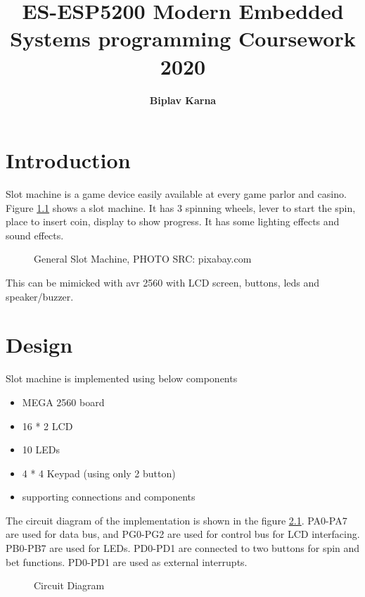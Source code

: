 \documentclass[a4paper,13pt,openany,sffamily]{memoir}
\title{\Huge\bfseries ES-ESP5200 Modern Embedded Systems programming Coursework 2020}
\author{\LARGE \bfseries Biplav Karna}
\begin{document}
\maketitle

\chapter {Introduction}
Slot machine is a game device easily available at every game parlor and casino. Figure \ref{Fig_Casino_Slot_Machine} shows a slot machine. It has 3 spinning wheels, lever to start the spin, place to insert coin, display to show progress. It has some lighting effects and sound effects. 

\begin{figure}[htbp]
\caption{General Slot Machine, PHOTO SRC: pixabay.com}
\label{Fig_Casino_Slot_Machine}
\end{figure}


This can be mimicked with avr 2560 with LCD screen, buttons, leds and speaker/buzzer.


\chapter {Design}
Slot machine is implemented using below components

\begin{itemize}
\item MEGA 2560 board
\item 16 * 2 LCD 
\item 10 LEDs
\item 4 * 4 Keypad (using only 2 button)
\item supporting connections and components 
\end{itemize}

The circuit diagram of the implementation is shown in the figure \ref{Fig_Circuit_Diagram}. PA0-PA7 are used for data bus, and PG0-PG2 are used for control bus for LCD interfacing. PB0-PB7 are used for LEDs. PD0-PD1 are connected to two buttons for spin and bet functions. PD0-PD1 are used as external interrupts. 

\begin{figure}[h]
\caption{Circuit Diagram }
\label{Fig_Circuit_Diagram}
\end{figure}
\end{document}
